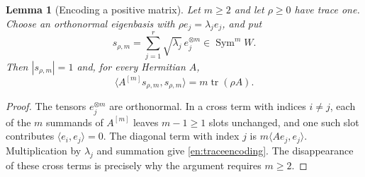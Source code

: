 \documentclass[12pt]{amsart}
\newtheorem{lem}[thm]{Lemma}
\theoremstyle{definition}
\theoremstyle{remark}
\numberwithin{equation}{section}
\DeclareMathOperator{\tr}{tr}
\DeclareMathOperator{\Sym}{Sym}
\theoremstyle{definition}
\begin{document}
\begin{lem}[Encoding a positive matrix]\label{en:encoding}
Let $m\geq2$ and let $\rho\geq0$ have trace one. Choose an orthonormal
eigenbasis with $\rho e_j=\lambda_j e_j$, and put
\begin{equation}\label{en:encodedvector}
 s_{\rho,m}=\sum_{j=1}^r\sqrt{\lambda_j}\,e_j^{\otimes m}
 \in\Sym^m W.
\end{equation}
Then $|s_{\rho,m}|=1$ and, for every Hermitian $A$,
\begin{equation}\label{en:traceencoding}
 \langle A^{[m]}s_{\rho,m},s_{\rho,m}\rangle
 =m\tr(\rho A).
\end{equation}
\end{lem}
\begin{proof}
The tensors $e_j^{\otimes m}$ are orthonormal. In a cross term with
indices $i\ne j$, each of the $m$ summands of $A^{[m]}$ leaves
$m-1\geq1$ slots unchanged, and one such slot contributes
$\langle e_i,e_j\rangle=0$. The diagonal term with index $j$ is
$m\langle Ae_j,e_j\rangle$. Multiplication by $\lambda_j$ and summation
give \eqref{en:traceencoding}. The disappearance of these cross terms
is precisely why the argument requires $m\geq2$.
\end{proof}
\end{document}
